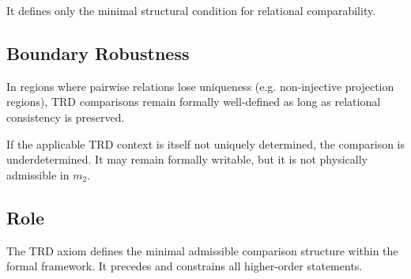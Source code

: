It defines only the minimal structural condition
for relational comparability.

\subsection*{Boundary Robustness}

In regions where pairwise relations lose uniqueness
(e.g. non-injective projection regions),
TRD comparisons remain formally well-defined
as long as relational consistency is preserved.

If the applicable TRD context is itself not uniquely determined,
the comparison is underdetermined. It may remain formally writable,
but it is not physically admissible in $m_2$.

\subsection*{Role}

The TRD axiom defines the minimal admissible comparison structure
within the formal framework.
It precedes and constrains all higher-order statements.
